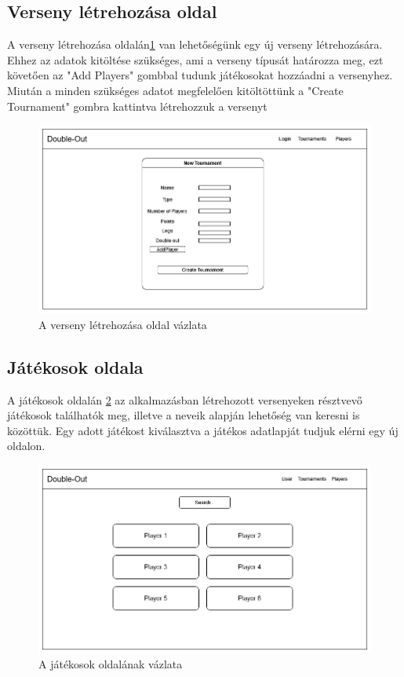 \subsection{Verseny létrehozása oldal}
A verseny létrehozása oldalán\ref{fig:newTournament} van lehetőségünk egy új verseny létrehozására. Ehhez az adatok kitöltése szükséges, ami a verseny típusát határozza meg, ezt követően az "Add Players" gombbal tudunk játékosokat hozzáadni a versenyhez. Miután a minden szükséges adatot megfelelően kitöltöttünk a "Create Tournament" gombra kattintva létrehozzuk a versenyt

\begin{figure}[h]
\centering
\includegraphics[scale=0.4]{images/NewTournament.png}
\caption{A verseny létrehozása oldal vázlata}
\label{fig:newTournament}
\end{figure}

\subsection{Játékosok oldala}
A játékosok oldalán \ref{fig:players} az alkalmazásban létrehozott versenyeken résztvevő játékosok találhatók meg, illetve a neveik alapján lehetőség van keresni is közöttük. Egy adott játékost kiválasztva a játékos adatlapját tudjuk elérni egy új oldalon.

\begin{figure}[h]
\centering
\includegraphics[scale=0.4]{images/PlayersPage.png}
\caption{A játékosok oldalának vázlata}
\label{fig:players}
\end{figure}

